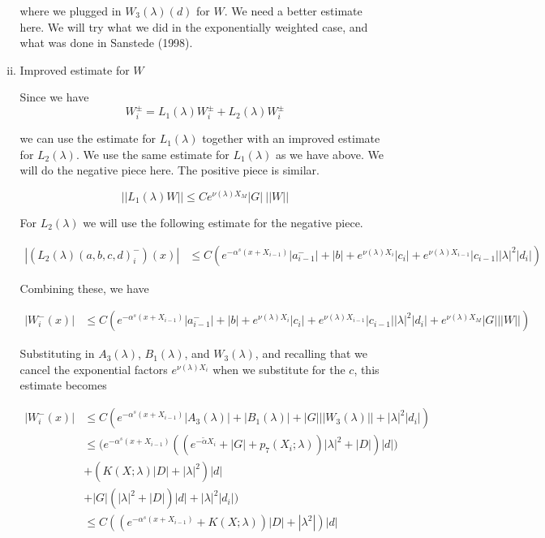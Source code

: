 \documentclass[12pt]{article}
\begin{document}
\begin{enumerate}
\begin{enumerate}[(i)]
where we plugged in $W_3(\lambda)(d)$ for $W$. We need a better estimate here. We will try what we did in the exponentially weighted case, and what was done in Sanstede (1998).

\item Improved estimate for $W$

Since we have 
\[
W_i^\pm = L_1(\lambda)W_i^\pm + L_2(\lambda)W_i^\pm 
\]

we can use the estimate for $L_1(\lambda)$ together with an improved estimate for $L_2(\lambda)$. We use the same estimate for $L_1(\lambda)$ as we have above. We will do the negative piece here. The positive piece is similar.

\[
||L_1(\lambda)W|| \leq C e^{\nu(\lambda)X_M} |G| \: ||W||
\]

For $L_2(\lambda)$ we will use the following estimate for the negative piece.

\begin{align*}
| (L_2(\lambda)(a, b, c, d)_i^-)(x)| &\leq C \left( e^{-\alpha^s(x + X_{i-1})} |a^-_{i-1}| + |b| + e^{\nu(\lambda)X_i} |c_i| + e^{\nu(\lambda)X_{i-1}} |c_{i-1}| |\lambda|^2 |d_i| \right)
\end{align*}

Combining these, we have

\begin{align*}
| W_i^-(x)| &\leq C \left( e^{-\alpha^s(x + X_{i-1})} |a^-_{i-1}| + |b| + e^{\nu(\lambda)X_i} |c_i| + e^{\nu(\lambda)X_{i-1}} |c_{i-1}| |\lambda|^2 |d_i| + e^{\nu(\lambda)X_M} |G| ||W|| \right)
\end{align*}

Substituting in $A_3(\lambda)$, $B_1(\lambda)$, and $W_3(\lambda)$, and recalling that we cancel the exponential factors $e^{\nu(\lambda)X_i}$ when we substitute for the $c$, this estimate becomes

\begin{align*}
| W_i^-(x)| &\leq C \left( e^{-\alpha^s(x + X_{i-1})} |A_3(\lambda)| + |B_1(\lambda)| + |G| ||W_3(\lambda)|| + |\lambda|^2 |d_i|  \right) \\
&\leq \Big( e^{-\alpha^s(x + X_{i-1})}( (e^{-\tilde{\alpha} X_i} + |G| + p_7(X_i; \lambda) ) |\lambda|^2  + |D|)|d|) \\
&+ ( K(X; \lambda) |D|+ |\lambda|^2 )|d| \\
&+ |G| ( |\lambda|^2 + |D|)|d| + |\lambda|^2 |d_i| \Big) \\
&\leq C( (e^{-\alpha^s(x + X_{i-1})} + K(X; \lambda))|D| + |\lambda^2|)|d|
\end{align*}


\end{enumerate}
\end{enumerate}
\end{document}
